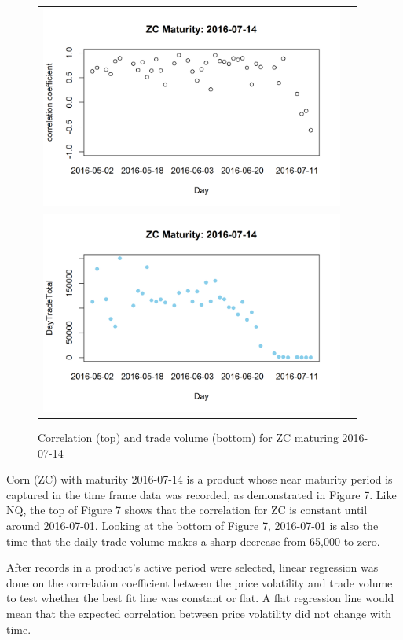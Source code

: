 \documentclass[12pt]{article}
\begin{document}
\begin{figure}[H]
	\begin{center}
		\begin{tabular}{cc}
			\includegraphics[width=10cm]{ZCcor_plot.png} \\ 
			\includegraphics[width=10cm]{ZCtradevolume.png}	\\ 
		\end{tabular}
	\end{center}
	\caption{Correlation (top) and trade volume (bottom) for ZC maturing 2016-07-14}
	\label{fig:ZC}
\end{figure}

Corn (ZC) with maturity 2016-07-14 is a product whose near maturity period is captured in the time frame data was recorded, as demonstrated in Figure 7. Like NQ, the top of Figure 7 shows that the correlation for ZC is constant until around 2016-07-01. Looking at the bottom of Figure 7, 2016-07-01 is also the time that the daily trade volume makes a sharp decrease from 65,000 to zero.

After records in a product's active period were selected, linear regression was  done on the correlation coefficient between the price volatility and trade volume to test whether the best fit line was constant or flat. A flat regression line would mean that the expected correlation between price volatility did not change with time.
\end{document}
